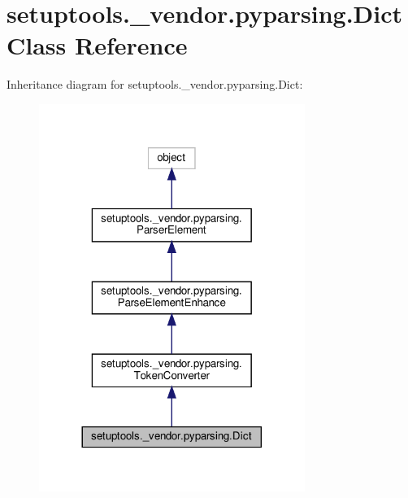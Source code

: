 \hypertarget{classsetuptools_1_1__vendor_1_1pyparsing_1_1Dict}{}\section{setuptools.\+\_\+vendor.\+pyparsing.\+Dict Class Reference}
\label{classsetuptools_1_1__vendor_1_1pyparsing_1_1Dict}


Inheritance diagram for setuptools.\+\_\+vendor.\+pyparsing.\+Dict\+:
\nopagebreak
\begin{figure}[H]
\begin{center}
\leavevmode
\includegraphics[width=245pt]{classsetuptools_1_1__vendor_1_1pyparsing_1_1Dict__inherit__graph}
\end{center}
\end{figure}



